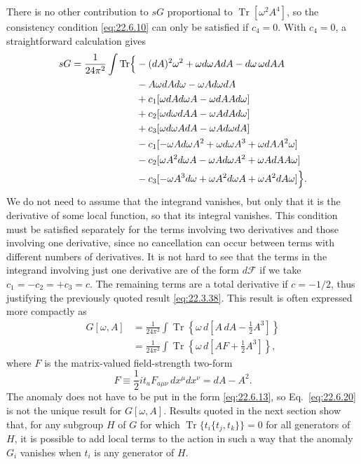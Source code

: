 There is no other contribution to $sG$ proportional to
$\operatorname{Tr}[\omega^2A^4]$, so the consistency condition
\eqref{eq:22.6.10} can only be satisfied if $c_4=0$. With $c_4=0$, a
straightforward calculation gives
\[
 \begin{aligned}
 sG=\frac{1}{24\pi^2}\int\operatorname{Tr}\Bigl\{
 &-(dA)^2\omega^2+\omega d\omega A dA-d\omega\,\omega dA A
 \\
 &-A\omega dA d\omega-\omega A d\omega dA
 \\
 &+c_1[\omega dA d\omega A-\omega dA A d\omega]
 \\
 &+c_2[\omega d\omega dA A-\omega A dA d\omega]
 \\
 &+c_3[\omega d\omega A dA-\omega A d\omega dA]
 \\
 &-c_1[-\omega A d\omega A^2+\omega d\omega A^3
       +\omega dA A^2\omega]
 \\
 &-c_2[\omega A^2d\omega A-\omega A d\omega A^2
       +\omega A dA A\omega]
 \\
 &-c_3[-\omega A^3d\omega+\omega A^2d\omega A
       +\omega A^2dA\omega]\Bigr\}.
 \end{aligned}
\]
We do not need to assume that the integrand vanishes, but only that it is
the derivative of some local function, so that its integral vanishes. This
condition must be satisfied separately for the terms involving two
derivatives and those involving one derivative, since no cancellation can
occur between terms with different numbers of derivatives. It is not hard
to see that the terms in the integrand involving just one derivative are
of the form $d\mathcal F$ if we take
$c_1=-c_2=+c_3=c$. The remaining terms are a total derivative if
$c=-1/2$, thus justifying the previously quoted result
\eqref{eq:22.3.38}. This result is often expressed more compactly as
\begin{equation}
 \begin{aligned}
 G[\omega,A]
 &=\frac{1}{24\pi^2}\int
 \operatorname{Tr}\left\{\omega\,d\left[
 A\,dA-\frac12A^3\right]\right\}
 \\
 &=\frac{1}{24\pi^2}\int
 \operatorname{Tr}\left\{\omega\,d\left[
 AF+\frac12A^3\right]\right\},
 \end{aligned}
 \tag{22.6.20}\label{eq:22.6.20}
\end{equation}
where $F$ is the matrix-valued field-strength two-form
\begin{equation}
 F\equiv\frac12 it_a F_{a\mu\nu}\,dx^\mu dx^\nu
 =dA-A^2.
 \tag{22.6.21}\label{eq:22.6.21}
\end{equation}
The anomaly does not have to be put in the form \eqref{eq:22.6.13}, so
Eq.~\eqref{eq:22.6.20} is not the unique result for $G[\omega,A]$. Results
quoted in the next section show that, for any subgroup $H$ of $G$ for
which $\operatorname{Tr}\{t_i\{t_j,t_k\}\}=0$ for all generators of $H$,
it is possible to add local terms to the action in such a way that the
anomaly $G_i$ vanishes when $t_i$ is any generator of $H$.


